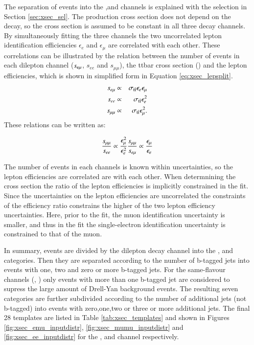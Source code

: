 The separation of events into the \emu,\mumu and \ee channels is explained with the selection in Section \ref{sec:xsec_sel}. The \ttbar production cross section does not depend on the decay, so the cross section is assumed to be constant in all three decay channels.
By simultaneously fitting the three channels the two uncorrelated lepton identification efficiencies $\epsilon_e$ and $\epsilon_\mu$ are correlated with each other. 
These correlations can be illustrated by the relation between the number of \ttbar events in each dilepton channel ($s_{\mathrm{e}\mu}$, $s_{ee}$ and $s_{\mu\mu}$), the ttbar cross section (\stt) and the lepton 
efficiencies, which is shown in simplified form in Equation \ref{eq:xsec_lepsplit}.
\begin{eqnarray}
s_{e \mu}  &\propto& \sigma_\mathrm{t\bar{t}} \epsilon_{e} \epsilon_{\mu}  \\
s_{ee}  &\propto&  \sigma_\mathrm{t\bar{t}} \epsilon_{e}^2  \\
s_{\mu \mu}  &\propto&  \sigma_\mathrm{t\bar{t}} \epsilon_{\mu}^2
\label{eq:xsec_lepsplit}.
\end{eqnarray}
These relations can be written as: 

\begin{equation}
\frac{s_{\mu\mu}}{s_{ee}} \propto \frac{\epsilon_{\mu}^2}{\epsilon_{e}^2} \vspace{0.4cm} \frac{s_{\mu\mu}}{s_{e\mu}} \propto \frac{\epsilon_{\mu}}{\epsilon_{e}}
\label{eq:xsec_lepeffs}
\end{equation}

The number of events in each channels is known within uncertainties, so the lepton efficiencies are correlated are with each other.
When determnining the \ttbar cross section the ratio of the lepton efficiencies is implicitly constrained in the fit.
Since the uncertainties on the lepton efficiencies are uncorrelated the constraints of the efficiency ratio constrains the higher of the two lepton efficiency uncertainties.
Here, prior to the fit, the muon identification uncertainty is smaller, and thus in the fit the single-electron identification uncertainty is constrained to that of the muon.

In summary, events are divided by the dilepton decay channel into the \emu, \ee and \mumu categories. Then they are separated according to the number of b-tagged jets into events with one, two and zero or more b-tagged jets. 
For the same-flavour channels (\ee, \mumu) only events with more than one b-tagged jet are considered to supress the large amount of Drell-Yan background events. The resulting seven categories are further subdivided according to the number of additional jets (not b-tagged) into events with zero,one,two or three or more additional jets.
The final 28 templates are listed in Table \ref{tab:xsec_templates} and shown in Figures 
 \ref{fig:xsec_emu_inputdistr}, \ref{fig:xsec_mumu_inputdistr} and \ref{fig:xsec_ee_inputdistr} for the \emu, \mumu and \ee channel respectively.

